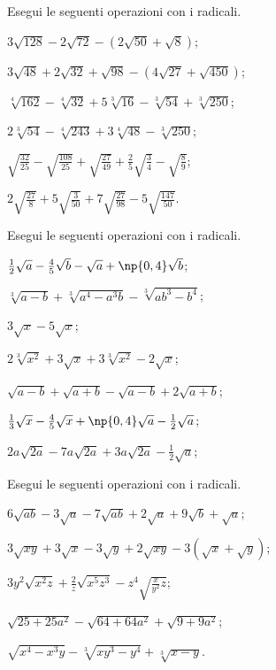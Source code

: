 \begin{esercizio}[\Ast]
 \label{ese:2.66}
Esegui le seguenti operazioni con i radicali.
 \begin{multicols}{2}
 \begin{enumeratea}
 \item $3\sqrt{128}-2\sqrt{72}-(2\sqrt{50}+\sqrt 8)$;
 \item $3\sqrt{48}+2\sqrt{32}+\sqrt{98}-(4\sqrt{27}+\sqrt{450})$;
 \item $\sqrt[4]{162}-\sqrt[4]{32}+5\sqrt[3]{16}-\sqrt[3]{54}+\sqrt[3]{250}$;
 \item $2\sqrt[3]{54}-\sqrt[4]{243}+3\sqrt[4]{48}-\sqrt[3]{250}$;
 \item $\sqrt{\frac{32}{25}}-\sqrt{\frac{108}{25}}+\sqrt{\frac{27}{49}}+\frac 2 5\sqrt{\frac 3 4}-\sqrt{\frac 8 9}$;
 \item $2\sqrt{\frac{27} 8}+5\sqrt{\frac 3{50}}+7\sqrt{\frac{27}{98}}-5\sqrt{\frac{147}{50}}$.
 \end{enumeratea}
 \end{multicols}
\end{esercizio}
\pagebreak
\begin{esercizio}[\Ast]
 \label{ese:2.67}
Esegui le seguenti operazioni con i radicali.
 \begin{multicols}{2}
 \begin{enumeratea}
 \item $\frac 1 2\sqrt a-\frac 4 5\sqrt b-\sqrt a+\np{0,4}\sqrt b$;
 \item $\sqrt[3]{a-b}+\sqrt[3]{a^4-a^3b}-\sqrt[3]{{ab}^3-b^4}$;
 \item $3\sqrt x-5\sqrt x$;
 \item $2\sqrt[3]{x^2}+3\sqrt x+3\sqrt[3]{x^2}-2\sqrt x$;
 \item $\sqrt{a-b}+\sqrt{a+b}-\sqrt{a-b}+2\sqrt{a+b}$;
 \item $\frac 1 3\sqrt x-\frac 4 5\sqrt x+\np{0,4}\sqrt a-\frac 1 2\sqrt a$;
 \item $2a\sqrt{2a}-7a\sqrt{2a}+3a\sqrt{2a}-\frac 1 2\sqrt a$;
 \end{enumeratea}
 \end{multicols}
\end{esercizio}

\begin{esercizio}[\Ast]
 \label{ese:2.68}
Esegui le seguenti operazioni con i radicali.
 \begin{enumeratea}
 \item $6\sqrt{{ab}}-3\sqrt a-7\sqrt{{ab}}+2\sqrt a+9\sqrt b+\sqrt a$;
 \item $3\sqrt{xy}+3\sqrt x-3\sqrt y+2\sqrt{xy}-3(\sqrt x+\sqrt y)$;
 \item $3y^{2}\sqrt{x^{2}z}+\frac{2}{z}\sqrt{x^{5}z^{3}}-z^{4}\sqrt{\frac{x}{y^{2}}z}$;
 \item $\sqrt{25+25a^{2}}-\sqrt{64+64a^{2}}+\sqrt{9+9a^{2}}$;
 \item $\sqrt{x^{4}-x^{3}y}-\sqrt[3]{xy^{3}-y^{4}}+\sqrt[3]{x-y}$.
 \end{enumeratea}
\end{esercizio}

